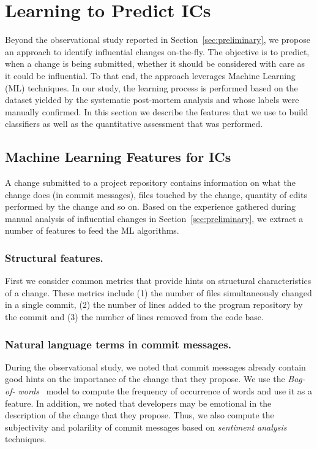 \section{Learning to Predict IC{\scriptsize s}}
\label{sec:model}

Beyond the observational study reported in Section~\ref{sec:preliminary}, we
propose an approach to identify influential changes on-the-fly. The objective
is to predict, when a change is being submitted, whether it should be
considered with care as it could be influential. To that end, the approach
leverages Machine Learning (ML) techniques. In our study, the learning process
is performed based on the dataset yielded by the systematic post-mortem
analysis and whose labels were manually confirmed. In this section we describe
the features that we use to build classifiers as well as the quantitative
assessment that was performed.

\subsection{Machine Learning Features for ICs}

A change submitted to a project repository contains information on what the
change does (in commit messages), files touched by the change, quantity of
edits performed by the change and so on. Based on the experience gathered
during manual analysis of influential changes in
Section~\ref{sec:preliminary}, we extract a number of features to feed the ML
algorithms.


\subsubsection{Structural features.}
First we consider common metrics that provide hints on structural
characteristics of a change.
These metrics include (1) the number of files simultaneously changed in a single
commit, (2) the number of lines added to the program repository by the 
commit and (3) the number of lines removed from the code base.


\subsubsection{Natural language terms in commit messages.} During the
observational study, we noted that commit messages already contain good hints
on the importance of the change that they propose. We use the {\em Bag-of-
words}~\cite{lewis:ecml:1998} model to compute the frequency of occurrence of
words and use it as a feature. In addition, we noted that developers may be
emotional in the description of the change that they propose. Thus, we also
compute the subjectivity and polarility of commit messages based on {\em
sentiment analysis}~\cite{hu_opinion_2006,ohana_opinion_2009,
liu_sentiment_2010,thelwall_sentiment_2010} techniques.


